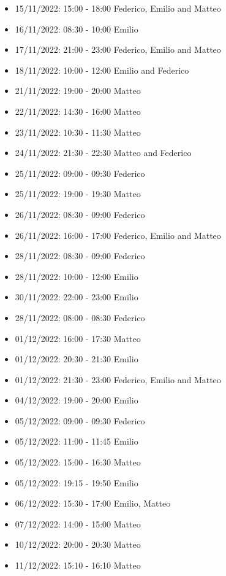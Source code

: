 \begin{itemize}
    \item 15/11/2022: 15:00 - 18:00 Federico, Emilio and Matteo
    \item 16/11/2022: 08:30 - 10:00 Emilio
    \item 17/11/2022: 21:00 - 23:00 Federico, Emilio and Matteo
    \item 18/11/2022: 10:00 - 12:00 Emilio and Federico
    \item 21/11/2022: 19:00 - 20:00 Matteo
    \item 22/11/2022: 14:30 - 16:00 Matteo
    \item 23/11/2022: 10:30 - 11:30 Matteo
    \item 24/11/2022: 21:30 - 22:30 Matteo and Federico
    \item 25/11/2022: 09:00 - 09:30 Federico
    \item 25/11/2022: 19:00 - 19:30 Matteo
    \item 26/11/2022: 08:30 - 09:00 Federico
    \item 26/11/2022: 16:00 - 17:00 Federico, Emilio and Matteo
    \item 28/11/2022: 08:30 - 09:00 Federico
    \item 28/11/2022: 10:00 - 12:00 Emilio
    \item 30/11/2022: 22:00 - 23:00 Emilio
    \item 28/11/2022: 08:00 - 08:30 Federico
    \item 01/12/2022: 16:00 - 17:30 Matteo
    \item 01/12/2022: 20:30 - 21:30 Emilio
    \item 01/12/2022: 21:30 - 23:00 Federico, Emilio and Matteo
    \item 04/12/2022: 19:00 - 20:00 Emilio
    \item 05/12/2022: 09:00 - 09:30 Federico
    \item 05/12/2022: 11:00 - 11:45 Emilio
    \item 05/12/2022: 15:00 - 16:30 Matteo
    \item 05/12/2022: 19:15 - 19:50 Emilio
    \item 06/12/2022: 15:30 - 17:00 Emilio, Matteo
    \item 07/12/2022: 14:00 - 15:00 Matteo
    \item 10/12/2022: 20:00 - 20:30 Matteo
    \item 11/12/2022: 15:10 - 16:10 Matteo
\end{itemize}